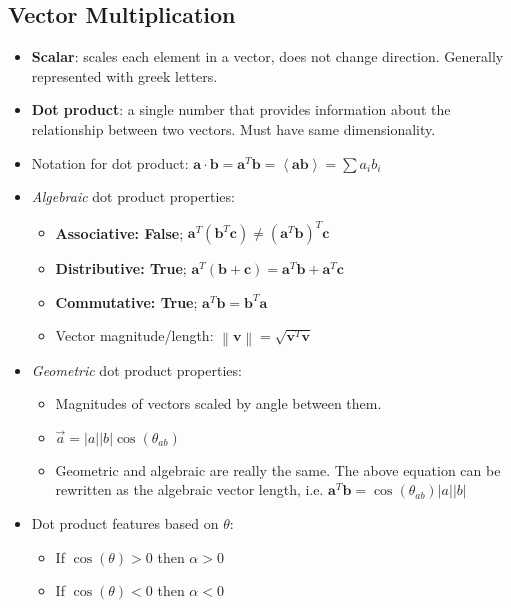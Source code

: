 \documentclass[12pt,a4paper]{article}
\begin{document}
\subsection{Vector Multiplication}
\begin{itemize}
    \item \textbf{Scalar}: scales each element in a vector, does not change direction. Generally represented with greek letters.
    \item \textbf{Dot product}: a single number that provides information about the relationship between two vectors. Must have same dimensionality.
    \item Notation for dot product: \(\bm{a}\cdot \bm{b} = \bm{a}^T\bm{b} = \left\langle \bm{ab} \right\rangle = \sum a_i b_i\)
    \item \textit{Algebraic} dot product properties:
        \begin{itemize}
            \item \textbf{Associative: {\color{false}False}}; \(\bm{a}^T(\bm{b}^T\bm{c}) \neq (\bm{a}^T\bm{b})^T\bm{c}\)
            \item \textbf{Distributive: {\color{true}True}}; \(\bm{a}^T(\bm{b}+\bm{c}) = \bm{a}^T\bm{b} + \bm{a}^T\bm{c}\)
            \item \textbf{Commutative: {\color{true}True}}; \(\bm{a}^T\bm{b} = \bm{b}^T\bm{a}\)
            \item Vector magnitude/length: \(\left\lVert \bm{v}\right\rVert = \sqrt{\bm{v}^T\bm{v}}\)
        \end{itemize}
    \item \textit{Geometric} dot product properties:
        \begin{itemize}
            \item Magnitudes of vectors scaled by angle between them.
            \item \(\vec{a} = |a||b|\cos(\theta_{ab})\)
            \item Geometric and algebraic are really the same. The above equation can be rewritten as the algebraic vector length, i.e.  \(\bm{a}^T\bm{b} = \cos(\theta_{ab})|a||b|\)
        \end{itemize}
    \item Dot product features based on \(\theta\):
        \begin{itemize}
            \item If {\color{pos}\(\cos(\theta) > 0\)} then {\color{pos}\(\alpha > 0\)}
            \item If {\color{neg}\(\cos(\theta) < 0\)} then {\color{neg}\(\alpha < 0\)}

\end{itemize}
\end{itemize}
\end{document}
